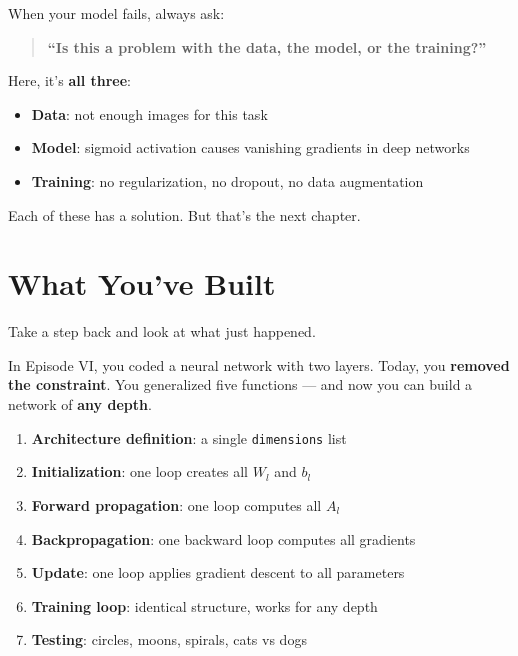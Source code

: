 \documentclass[11pt]{article}
\begin{document}
\begin{insightbox}[title=The Million-Dollar Question]
When your model fails, always ask:

\begin{quote}
\textbf{``Is this a problem with the data, the model, or the training?''}
\end{quote}

Here, it's \textbf{all three}:
\begin{itemize}
  \item \textbf{Data}: not enough images for this task
  \item \textbf{Model}: sigmoid activation causes vanishing gradients in deep networks
  \item \textbf{Training}: no regularization, no dropout, no data augmentation
\end{itemize}

Each of these has a solution. But that's the next chapter.
\end{insightbox}


\section{What You've Built}

Take a step back and look at what just happened.

In Episode VI, you coded a neural network with two layers. Today, you \textbf{removed the constraint}. You generalized five functions --- and now you can build a network of \textbf{any depth}.

\begin{resultbox}[title=Your Deep Neural Network --- From Scratch]
\begin{enumerate}[label=\textbf{\arabic*.}]
  \item \textbf{Architecture definition}: a single \texttt{dimensions} list
  \item \textbf{Initialization}: one loop creates all $W_l$ and $b_l$
  \item \textbf{Forward propagation}: one loop computes all $A_l$
  \item \textbf{Backpropagation}: one backward loop computes all gradients
  \item \textbf{Update}: one loop applies gradient descent to all parameters
  \item \textbf{Training loop}: identical structure, works for any depth
  \item \textbf{Testing}: circles, moons, spirals, cats vs dogs
\end{enumerate}
\end{resultbox}
\end{document}
